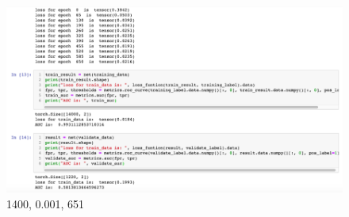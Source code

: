 \documentclass{article}
\begin{document}
\begin{figure}[h]
  \centering
  \includegraphics[width=1.0\textwidth]{img/Picture 14}
  \caption{1400, 0.001, 651}
\end{figure}
\end{document}
